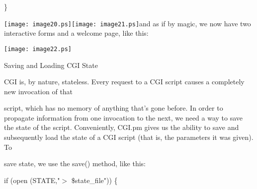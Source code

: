 \documentclass[a4paper,11pt]{book}
\begin{document}
\noindent \}

\noindent 

\noindent \texttt{[image: image20.ps]}\texttt{[image: image21.ps]}and as if by magic, we now have two interactive forms and a welcome page, like this:

\noindent \texttt{[image: image22.ps]}

\noindent 

\noindent 

\noindent 

\noindent 

\noindent 

\noindent 

\noindent 

\noindent 

\noindent 

\noindent 

\noindent 

\noindent 

\noindent 

\noindent 

\noindent 

\noindent 

\noindent 

\noindent 

\noindent 

\noindent 

\noindent 

\noindent Saving and Loading CGI State

\noindent 

\noindent CGI is, by nature, stateless. Every request to a CGI script causes a completely new invocation of that

\noindent script, which has no memory of anything that's gone before. In order to propagate information from one invocation to the next, we need a way to save the state of the script. Conveniently, CGI.pm gives us the ability to save and subsequently load the state of a CGI script (that is, the parameters it was given). To

\noindent save state, we use the save() method, like this:

\noindent 

\noindent if (open (STATE,"$>$ \$state\_file")) \{
\end{document}
